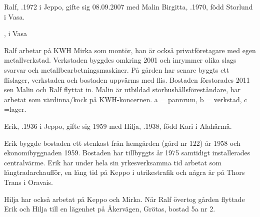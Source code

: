 %



%
Ralf, .1972 i Jeppo, gifte sig 08.09.2007 med Malin Birgitta, .1970, född Storlund i Vasa.
\begin{jhchildren}
  \item {}, i Vasa
  \item {}
  \item {}
\end{jhchildren}

Ralf arbetar på KWH Mirka som montör, han är också privatföretagare med egen metallverkstad. Verkstaden byggdes omkring 2001 och inrymmer olika slags svarvar och metallbearbetningsmaskiner. På gården har senare byggts ett flislager, verkstaden och bostaden uppvärms med flis. Bostaden förstorades 2011 sen Malin och Ralf flyttat in. Malin är utbildad storhushållsföreståndare, har	arbetat som värdinna/kock på KWH-koncernen. a = pannrum, b = verkstad, c =lager.


%
Erik, .1936 i Jeppo, gifte sig 1959 med Hilja, .1938, född Kari i Alahärmä.
\begin{jhchildren}
  \item {}
  \item {}
\end{jhchildren}
Erik byggde bostaden ett stenkast från hemgården (gård nr 122) år	1958 och ekonomibyggnaden 1959. Bostaden har tillbyggts år 1975 samtidigt installerades centralvärme. Erik har under hela sin yrkesverksamma tid arbetat som långtradarchaufför, en lång tid på Keppo i utrikestrafik och några år på Thors Trans i  Oravais.

Hilja har också arbetat på Keppo och Mirka. När Ralf övertog gården flyttade Erik och Hilja till en lägenhet på Åkervägen, Grötas, bostad 5a nr 2.



